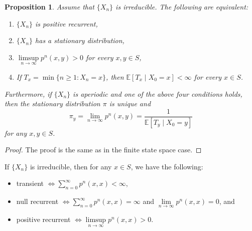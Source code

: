 \documentclass{tufte-handout}
\newcommand*\E{\mathbb{E}}
\newtheorem{prop}[thm]{Proposition}
\theoremstyle{definition}
\begin{document}
\begin{prop}
	Assume that $\{X_n\}$ is irreducible. The following are equivalent:
	\begin{enumerate}
		\item $\{X_n\}$ is positive recurrent,
		\item $\{X_n\}$ has a stationary distribution,
		\item $\limsup\limits_{n \to \infty} p^n(x,y) > 0$ for every $x,y \in S$,
		\item If $T_x = \min \{n \ge 1:X_n = x\}$, then $\E\left[T_x \mid X_0 = x\right] < \infty$ for every $x \in S$.
	\end{enumerate}
	Furthermore, if $\{X_n\}$ is aperiodic and one of the above four conditions holds, then the stationary distribution $\pi$ is unique and \[
		\pi_y = \lim\limits_{n \to \infty} p^n(x,y) = \frac{1}{\E\left[T_y \mid X_0= y\right]}
	\] for any $x,y \in S$.
\end{prop}
\begin{proof}
	The proof is the same as in the finite state space case.
\end{proof}

If $\{X_n\}$ is irreducible, then for any $x \in S$, we have the following:
\begin{itemize}
	\item transient $\iff \sum\limits_{n=0}^{\infty} p^n(x,x) < \infty$,
	\item null recurrent $\iff \sum\limits_{n=0}^{\infty} p^n(x,x) = \infty$ and $\lim\limits_{n \to \infty} p^n(x,x) = 0$, and
	\item positive recurrent $\iff \limsup\limits_{n \to \infty} p^n(x,x) > 0$.
\end{itemize}

\end{document}
